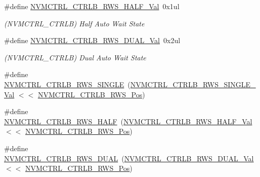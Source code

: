 \begin{DoxyCompactItemize}
\#define \mbox{\hyperlink{group___s_a_m_d21___n_v_m_c_t_r_l_gaaf0413ccbb9e3c4ebfe2c2f8f2a10da6}{N\+V\+M\+C\+T\+R\+L\+\_\+\+C\+T\+R\+L\+B\+\_\+\+R\+W\+S\+\_\+\+H\+A\+L\+F\+\_\+\+Val}}~0x1ul
\begin{DoxyCompactList}\small\item\em (N\+V\+M\+C\+T\+R\+L\+\_\+\+C\+T\+R\+LB) Half Auto Wait State \end{DoxyCompactList}\item 
\#define \mbox{\hyperlink{group___s_a_m_d21___n_v_m_c_t_r_l_ga757070851f4e48ecc24b2d75da0aa6e2}{N\+V\+M\+C\+T\+R\+L\+\_\+\+C\+T\+R\+L\+B\+\_\+\+R\+W\+S\+\_\+\+D\+U\+A\+L\+\_\+\+Val}}~0x2ul
\begin{DoxyCompactList}\small\item\em (N\+V\+M\+C\+T\+R\+L\+\_\+\+C\+T\+R\+LB) Dual Auto Wait State \end{DoxyCompactList}\item 
\#define \mbox{\hyperlink{group___s_a_m_d21___n_v_m_c_t_r_l_ga3011ea9db7c53bb00f357712c1d7d4b2}{N\+V\+M\+C\+T\+R\+L\+\_\+\+C\+T\+R\+L\+B\+\_\+\+R\+W\+S\+\_\+\+S\+I\+N\+G\+LE}}~(\mbox{\hyperlink{group___s_a_m_d21___n_v_m_c_t_r_l_ga38b52d3de7998f872c54a599e4e21f25}{N\+V\+M\+C\+T\+R\+L\+\_\+\+C\+T\+R\+L\+B\+\_\+\+R\+W\+S\+\_\+\+S\+I\+N\+G\+L\+E\+\_\+\+Val}}  $<$$<$ \mbox{\hyperlink{group___s_a_m_d21___n_v_m_c_t_r_l_ga43e4b7eb29abd297bee59f003d715e26}{N\+V\+M\+C\+T\+R\+L\+\_\+\+C\+T\+R\+L\+B\+\_\+\+R\+W\+S\+\_\+\+Pos}})
\item 
\#define \mbox{\hyperlink{group___s_a_m_d21___n_v_m_c_t_r_l_ga49c5e1bdebf752025bc9874c096865e4}{N\+V\+M\+C\+T\+R\+L\+\_\+\+C\+T\+R\+L\+B\+\_\+\+R\+W\+S\+\_\+\+H\+A\+LF}}~(\mbox{\hyperlink{group___s_a_m_d21___n_v_m_c_t_r_l_gaaf0413ccbb9e3c4ebfe2c2f8f2a10da6}{N\+V\+M\+C\+T\+R\+L\+\_\+\+C\+T\+R\+L\+B\+\_\+\+R\+W\+S\+\_\+\+H\+A\+L\+F\+\_\+\+Val}}    $<$$<$ \mbox{\hyperlink{group___s_a_m_d21___n_v_m_c_t_r_l_ga43e4b7eb29abd297bee59f003d715e26}{N\+V\+M\+C\+T\+R\+L\+\_\+\+C\+T\+R\+L\+B\+\_\+\+R\+W\+S\+\_\+\+Pos}})
\item 
\#define \mbox{\hyperlink{group___s_a_m_d21___n_v_m_c_t_r_l_ga5b895ffd7c3df025c5accf229c03512e}{N\+V\+M\+C\+T\+R\+L\+\_\+\+C\+T\+R\+L\+B\+\_\+\+R\+W\+S\+\_\+\+D\+U\+AL}}~(\mbox{\hyperlink{group___s_a_m_d21___n_v_m_c_t_r_l_ga757070851f4e48ecc24b2d75da0aa6e2}{N\+V\+M\+C\+T\+R\+L\+\_\+\+C\+T\+R\+L\+B\+\_\+\+R\+W\+S\+\_\+\+D\+U\+A\+L\+\_\+\+Val}}    $<$$<$ \mbox{\hyperlink{group___s_a_m_d21___n_v_m_c_t_r_l_ga43e4b7eb29abd297bee59f003d715e26}{N\+V\+M\+C\+T\+R\+L\+\_\+\+C\+T\+R\+L\+B\+\_\+\+R\+W\+S\+\_\+\+Pos}})
\item 
$$
\end{DoxyCompactItemize}

